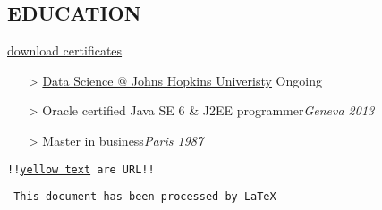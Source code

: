\documentclass{res}
\begin{document}
\begin{resume}
\section{EDUCATION}  \hfill\href{https://drive.google.com/file/d/0BzNXwOua274uZ3A2LVNNRjEzaGc/view?usp=sharing}{download certificates}
\begin{enumerate}[leftmargin=0cm]
\item[>]\href{https://www.coursera.org/specialization/jhudatascience/1?utm_medium=dashboard}{Data Science @ Johns Hopkins Univeristy} \hfill Ongoing
\item[>]Oracle certified Java SE 6 \& J2EE programmer\hfill \textit{Geneva 2013}
\item[>]Master in business\hfill \textit{Paris 1987}
\end{enumerate}					

\vspace{1.2cm}
\centerline{\texttt{!!\textcolor{myyellow}{\href{https://www.google.fr/}{yellow text}} are URL!!}}
\centerline{\texttt{\color{mylightblue} This document has been processed by \LaTeX}}

\end{resume}
\end{document}
